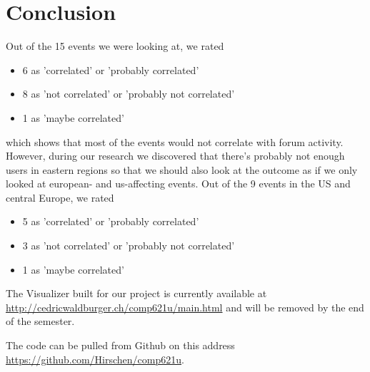 \documentclass[11pt,a4paper,english]{article}
\begin{document}
	\section{Conclusion}
		Out of the 15 events we were looking at, we rated
		\begin{itemize}
			\item 6 as 'correlated' or 'probably correlated'
			\item 8 as 'not correlated' or 'probably not correlated'
			\item 1 as 'maybe correlated'
		\end{itemize}
		which shows that most of the events would not correlate with forum activity. However, during our research we discovered that there's probably not enough users in eastern regions so that we should also look at the outcome as if we only looked at european- and us-affecting events. Out of the 9 events in the US and central Europe, we rated 
		\begin{itemize}
			\item 5 as 'correlated' or 'probably correlated'
			\item 3 as 'not correlated' or 'probably not correlated'
			\item 1 as 'maybe correlated'
		\end{itemize}
	
		The Visualizer built for our project is currently available at \url{http://cedricwaldburger.ch/comp621u/main.html} and will be removed by the end of the semester. 

		The code can be pulled from Github on this address \url{https://github.com/Hirschen/comp621u}.
\end{document}
